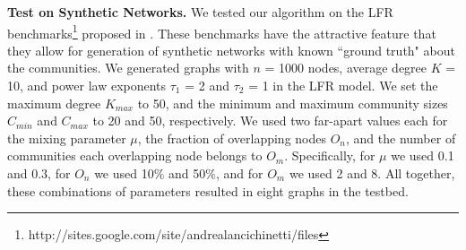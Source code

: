 {\bf Test on Synthetic Networks. } We tested our algorithm on the LFR benchmarks\footnote{http://sites.google.com/site/andrealancichinetti/files} proposed in \cite{2008PhRvE..78d6110L}. These benchmarks have the attractive feature that they allow
for generation of synthetic networks with known ``ground truth"  about the communities.
We generated graphs with $n$ = 1000 nodes, average degree $K$ = 10, and power law exponents $\tau_1$ = 2 and $\tau_2$ = 1 in the LFR model. We set the maximum degree $K_{max}$ to 50, and the minimum and maximum community sizes $C_{min}$ and $C_{max}$ to 20 and 50, respectively. We used two far-apart values each for the mixing parameter $\mu$, the fraction of overlapping nodes $O_n$, and the number of communities each overlapping node belongs to $O_m$. Specifically, for $\mu$ we used 0.1 and 0.3, for $O_n$ we used 10$\%$ and 50$\%$, and for $O_m$ we used 2 and 8. 
All together, these combinations of parameters resulted in eight graphs in the testbed.


